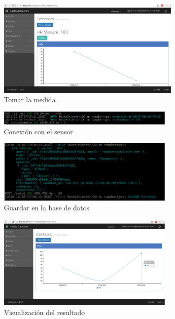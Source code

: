 \begin{figure}[htb]
\begin{center}
\includegraphics[width=0.8\textwidth]{./setup/conect1}
\caption{Tomar la medida}
\end{center}
\end{figure}

\begin{figure}[htb]
\begin{center}
\includegraphics[width=0.77\textwidth]{./setup/conexion1}
\caption{Conexión con el sensor}
\end{center}
\end{figure}

\begin{figure}[htb]
\begin{center}
\includegraphics[width=0.77\textwidth]{./setup/conexion2}
\caption{Guardar en la base de datos}
\end{center}
\end{figure}
\pagebreak
\begin{figure}[htb]
\begin{center}
\includegraphics[width=0.77\textwidth]{./setup/conect2}
\caption{Visualización del resultado}
\end{center}
\end{figure}

